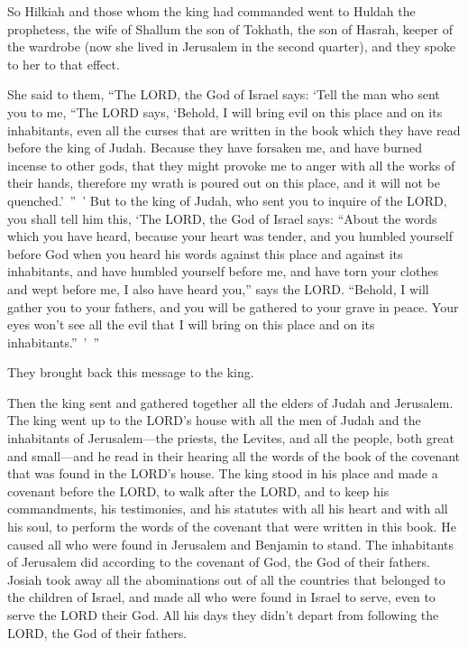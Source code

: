 \myverse{}So Hilkiah and those whom the king had commanded went to Huldah
the prophetess, the wife of Shallum the son of Tokhath, the son of Hasrah, keeper of the wardrobe (now
she lived in Jerusalem in the second quarter), and they spoke to her to that effect.

\myverse{}She said to them, “The LORD, the God of Israel says: ‘Tell the
man who sent you to me,
\myverse{}“The LORD says, ‘Behold, I will bring evil on this place and on its inhabitants,
even all the curses that are written in the book which they have read before the king of Judah.
\myverse{}Because they have forsaken me, and have burned incense to other gods, that
they might provoke me to anger with all the works of their hands, therefore my wrath is poured out on
this place, and it will not be quenched.’ ” ’
\myverse{}But to the king of Judah, who sent you to inquire of the LORD, you shall
tell him this, ‘The LORD, the God of Israel says: “About the words which you have heard,
\myverse{}because your heart was tender, and you humbled yourself before God when you
heard his words against this place and against its inhabitants, and have humbled yourself before me, and
have torn your clothes and wept before me, I also have heard you,” says the LORD.
\myverse{}“Behold, I will gather you to your fathers, and you will be gathered to your
grave in peace. Your eyes won’t see all the evil that I will bring on this place and on its inhabitants.” ’ ”

They brought back this message to the king.

\myverse{}Then the king sent and gathered together all the elders of Judah
and Jerusalem.
\myverse{}The king went up to the LORD’s house with all the men of Judah and the inhabitants
of Jerusalem—the priests, the Levites, and all the people, both great and small—and he read in their hearing
all the words of the book of the covenant that was found in the LORD’s house.
\myverse{}The king stood in his place and made a covenant before the LORD, to walk
after the LORD, and to keep his commandments, his testimonies, and his statutes with all his heart and
with all his soul, to perform the words of the covenant that were written in this book.
\myverse{}He caused all who were found in Jerusalem and Benjamin to stand. The inhabitants
of Jerusalem did according to the covenant of God, the God of their fathers.
\myverse{}Josiah took away all the abominations out of all the countries that belonged
to the children of Israel, and made all who were found in Israel to serve, even to serve the LORD their
God. All his days they didn’t depart from following the LORD, the God of their fathers.


